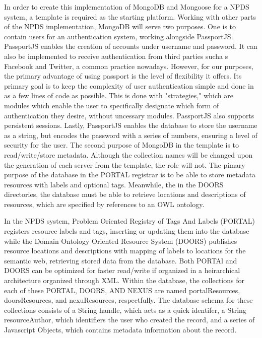 \documentclass[10pt,twocolumn,twoside]{article}
\begin{document}
	In order to create this implementation of MongoDB and Mongoose for a NPDS system, a template is required as the starting platform. Working with other parts of the NPDS implementation, MongoDB will serve two purposes. One is to contain users for an authentication system, working alongside PassportJS. PassportJS enables the creation of accounts under username and password. It can also be implemented to receive authentication from third parties sucha s Facebook and Twitter, a common practice nowadays. However, for our purposes, the primary advantage of using passport is the level of flexibility it offers. Its primary goal is to keep the complexity of user authentication simple and done in as a few lines of code as possible. This is done with "strategies," which are modules which enable the user to specifically designate which form of authentication they desire, without uncessary modules. PassportJS also supports persistent sessions. Lastly, PassportJS enables the database to store the username as a string, but encodes the password with a series of numbers, ensuring a level of security for the user. The second purpose of MongoDB in the template is to read/write/store metadata. Although the collection names will be changed upon the generation of each server from the template, the role will not. The pimary purpose of the database in the PORTAL registrar is to be able to store metadata resources with labels and optional tags. Meanwhile, the in the DOORS directories, the database must be able to retrieve locations and descriptions of resources, which are specified by references to an OWL ontology.	

	In the NPDS system, Problem Oriented Registry of Tags And Labels (PORTAL) registers resource labels and tags, inserting or updating them into the database while the Domain Ontology Oriented Resource System (DOORS) publishes resource locations and descriptions with mapping of labels to locations for the semantic web, retrieving stored data from the database. Both PORTAl and DOORS can be optimized for faster read/write if organized in a heirarchical architecture organized through XML. Within the database, the collections for each of these PORTAL, DOORS, AND NEXUS are named portalResources, doorsResources, and nexuResources, respectfully. The database schema for these collections consists of a String handle, which acts as a quick identifer, a String resourceAuthor, which identifiers the user who created the record, and a series of Javascript Objects, which contains metadata information about the record. 
\end{document}
